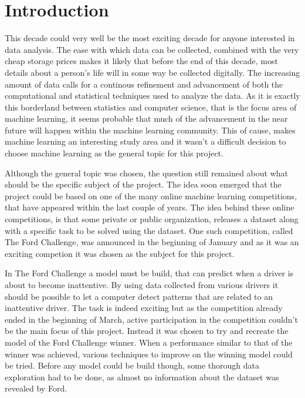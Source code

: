 \chapter{Introduction}

This decade could very well be the most exciting decade for anyone interested in data analysis. The ease with which data can be collected, combined with the very cheap storage prices makes it likely that before the end of this decade, most details about a person's life will in some way be collected digitally. The increasing amount of data calls for a continous refinement and advancement of both the computational and statistical techniques used to analyze the data. As it is exactly this borderland between statistics and computer science, that is the focus area of machine learning, it seems probable that much of the advancement in the near future will happen within the machine learning community. This of cause, makes machine learning an interesting study area and it wasn't a difficult decision to choose machine learning as the general topic for this project. \par

Although the general topic was chosen, the question still remained about what should be the specific subject of the project. The idea soon emerged that the project could be based on one of the many online machine learning competitions, that have appeared within the last couple of years. The idea behind these online competitions, is that some private or public organization, releases a dataset along with a specific task to be solved using the dataset. One such competition, called The Ford Challenge, was announced in the beginning of January and as it was an exciting competion it was chosen as the subject for this project. \par

In The Ford Challenge a model must be build, that can predict when a driver is about to become inattentive. By using data collected from various drivers it should be possible to let a computer detect patterns that are related to an inattentive driver. The task is indeed exciting but as the competition already ended in the beginning of March, active participation in the competition couldn't be the main focus of this project. Instead it was chosen to try and recreate the model of the Ford Challenge winner. When a performance similar to that of the winner was achieved, various techniques to improve on the winning model could be tried. Before any model could be build though, some thorough data exploration had to be done, as almost no information about the dataset was revealed by Ford. \par


